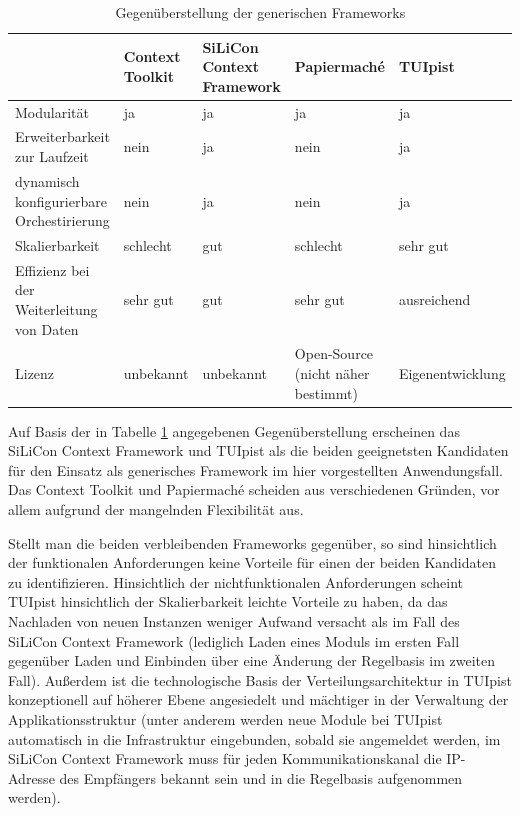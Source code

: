 \begin{table}[htbp]
	\centering
	\caption{Gegenüberstellung der generischen Frameworks}
	\begin{tabular}{| p{3cm} || p{2cm} | p{2cm} | p{2cm} | p{2cm} |} \hline
		 & Context Toolkit & SiLiCon Context Framework & Papiermaché & TUIpist \\ \hline \hline
		Modularität & ja & ja & ja & ja \\ \hline
		Erweiterbarkeit zur Laufzeit & nein & ja & nein & ja \\ \hline
		dynamisch konfigurierbare Orchestirierung & nein & ja & nein & ja \\ \hline
		Skalierbarkeit & schlecht & gut & schlecht & sehr gut \\ \hline
		Effizienz bei der Weiterleitung von Daten & sehr gut & gut & sehr gut & ausreichend \\ \hline
		Lizenz & unbekannt & unbekannt & Open-Source (nicht näher bestimmt) & Eigen\-entwicklung \\ \hline
	\end{tabular}
	\label{tab:generischeFrameworks}
\end{table}

Auf Basis der in Tabelle \ref{tab:generischeFrameworks} angegebenen Gegenüberstellung erscheinen das SiLiCon Context Framework und TUIpist als die beiden geeignetsten Kandidaten für den Einsatz als generisches Framework im hier vorgestellten Anwendungsfall. Das Context Toolkit und Papiermaché scheiden aus verschiedenen Gründen, vor allem aufgrund der mangelnden Flexibilität aus.

Stellt man die beiden verbleibenden Frameworks gegenüber, so sind hinsichtlich der funktionalen Anforderungen keine Vorteile für einen der beiden Kandidaten zu identifizieren. Hinsichtlich der nichtfunktionalen Anforderungen scheint TUIpist hinsichtlich der Skalierbarkeit leichte Vorteile zu haben, da das Nachladen von neuen Instanzen weniger Aufwand versacht als im Fall des SiLiCon Context Framework (lediglich Laden eines Moduls im ersten Fall gegenüber Laden und Einbinden über eine Änderung der Regelbasis im zweiten Fall). Außerdem ist die technologische Basis der Verteilungsarchitektur in TUIpist konzeptionell auf höherer Ebene angesiedelt und mächtiger in der Verwaltung der Applikationsstruktur (unter anderem werden neue Module bei TUIpist automatisch in die Infrastruktur eingebunden, sobald sie angemeldet werden, im SiLiCon Context Framework muss für jeden Kommunikationskanal die IP-Adresse des Empfängers bekannt sein und in die Regelbasis aufgenommen werden). 

